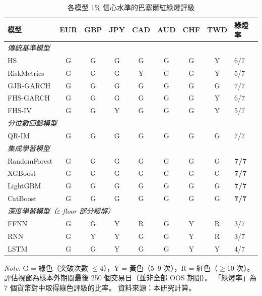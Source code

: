 \begin{table}[htbp]
    \centering
    \linespread{1.2}\selectfont
    \renewcommand{\arraystretch}{1.2}
    \fontsize{11pt}{15pt}\selectfont
    \vspace{3mm}
    \caption{各模型 1\% 信心水準的巴塞爾紅綠燈評級}
    \label{tab:basel}
    \begin{tabular}{lcccccccl}
        \hline
        \textbf{模型} & \textbf{EUR} & \textbf{GBP} & \textbf{JPY}
        & \textbf{CAD} & \textbf{AUD} & \textbf{CHF} & \textbf{TWD} & \textbf{綠燈率} \\
        \hline
        \multicolumn{9}{l}{\textit{傳統基準模型}} \\
        HS           & G & G & G & G & G & G & Y & 6/7 \\
        RiskMetrics  & G & G & G & Y & G & G & Y & 5/7 \\
        GJR-GARCH    & G & G & G & G & G & G & G & 7/7 \\
        FHS-GARCH    & G & G & G & G & G & G & Y & 6/7 \\
        FHS-IV       & G & G & Y & G & G & G & Y & 5/7 \\
        \hline
        \multicolumn{9}{l}{\textit{分位數回歸模型}} \\
        QR-IM        & G & G & G & G & G & G & G & 7/7 \\
        \hline
        \multicolumn{9}{l}{\textit{集成學習模型}} \\
        RandomForest & G & G & G & G & G & G & G & \textbf{7/7} \\
        XGBoost      & G & G & G & G & G & G & G & \textbf{7/7} \\
        LightGBM     & G & G & G & G & G & G & G & \textbf{7/7} \\
        CatBoost     & G & G & G & G & G & G & G & \textbf{7/7} \\
        \hline
        \multicolumn{9}{l}{\textit{深度學習模型（$\varepsilon$-floor 部分緩解）}} \\
        FFNN         & G & G & Y & R & G & Y & R & 3/7 \\
        RNN          & G & Y & Y & G & G & Y & R & 3/7 \\
        LSTM         & G & G & Y & G & G & Y & Y & 4/7 \\
        \hline
    \end{tabular}

    \vspace{2mm}

    \begin{minipage}{0.85\textwidth}
        \fontsize{9pt}{13pt}\selectfont
        \textit{Note.} G = 綠色（突破次數 $\leq 4$），Y = 黃色（5–9 次），R = 紅色（$\geq 10$ 次）。
        評估視窗為樣本外期間最後 250 個交易日（並非全部 OOS 期間）。
        「綠燈率」為 7 個貨幣對中取得綠色評級的比率。
        資料來源：本研究計算。
    \end{minipage}
\end{table}

